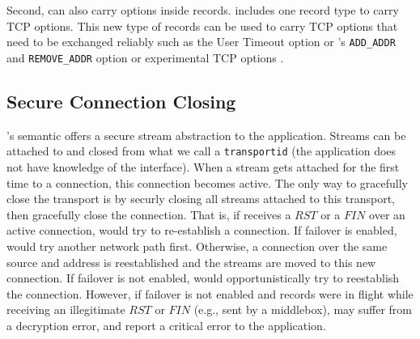 Second, \tcpls can also carry \tcp options inside \tls records. \tcpls includes
one record type to carry TCP options. This new type of records can be used to carry TCP options that need to be exchanged reliably such as the \tcp User Timeout option \cite{rfc5482} or \mptcp's \texttt{ADD\_ADDR} and \texttt{REMOVE\_ADDR} option or experimental TCP options \cite{rfc6994}. 



\subsection{Secure Connection Closing}

\tcpls's semantic offers a secure stream abstraction to the application.
Streams can be attached to and closed from what we call a \texttt{transportid}
(the application does not have knowledge of the \tcp interface). When a stream
gets attached for the first time to a \tcp connection, this connection becomes
active.  The only way to gracefully close the transport is by securly closing all
streams attached to this transport, then \tcpls gracefully close the \tcp
connection. That is, if \tcpls receives a $RST$ or a $FIN$ over an active \tcp
connection, \tcpls would try to re-establish
a \tcp connection. If failover is enabled, \tcpls would try another
network path first. Otherwise, a connection over the same
 source and address is
reestablished and the streams are moved to this new \tcp
connection. If failover is not enabled, \tcpls would opportunistically try to
reestablish the connection. However, if failover is not enabled and
records were in flight while receiving an illegitimate $RST$ or $FIN$
(e.g., sent by a
middlebox), \tcpls may suffer from a decryption error, and report a critical
error to the application.



